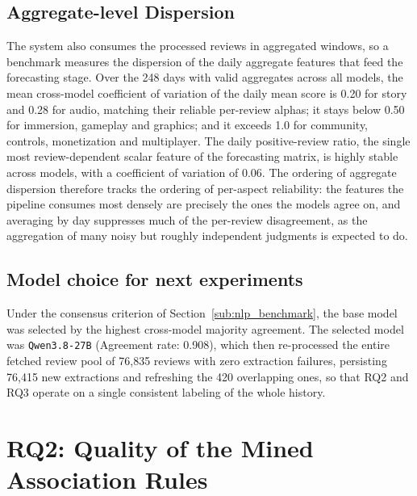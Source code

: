 \subsection{Aggregate-level Dispersion} \noindent The system also consumes the processed reviews in aggregated windows, so a benchmark measures the dispersion of the daily aggregate features that feed the forecasting stage. Over the 248 days with valid aggregates across all models, the mean cross-model coefficient of variation of the daily mean score is 0.20 for story and 0.28 for audio, matching their reliable per-review alphas; it stays below 0.50 for immersion, gameplay and graphics; and it exceeds 1.0 for community, controls, monetization and multiplayer. The daily positive-review ratio, the single most review-dependent scalar feature of the forecasting matrix, is highly stable across models, with a coefficient of variation of 0.06. The ordering of aggregate dispersion therefore tracks the ordering of per-aspect reliability: the features the pipeline consumes most densely are precisely the ones the models agree on, and averaging by day suppresses much of the per-review disagreement, as the aggregation of many noisy but roughly independent judgments is expected to do.


\subsection{Model choice for next experiments} \noindent Under the consensus criterion of Section~\ref{sub:nlp_benchmark}, the base model was selected by the highest cross-model majority agreement. The selected model was \texttt{Qwen3.8-27B} (Agreement rate: 0.908), which then re-processed the entire fetched review pool of 76{,}835 reviews with zero extraction failures, persisting 76{,}415 new extractions and refreshing the 420 overlapping ones, so that RQ2 and RQ3 operate on a single consistent labeling of the whole history.

\section{RQ2: Quality of the Mined Association Rules}
\label{sec:mining_results}

